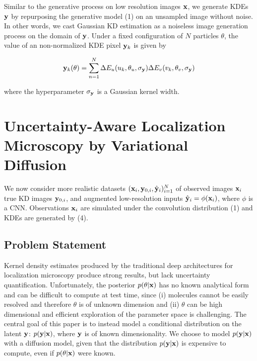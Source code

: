 \documentclass{article}
\begin{document}
Similar to the generative process on low resolution images $\bold{x}$, we generate KDEs $\bold{y}$ by repurposing the generative model (1) on an unsampled image without noise. In other words, we cast Gaussian KD estimation as a noiseless image generation process on the domain of $\bold{y}$. Under a fixed configuration of $N$ particles $\theta$, the value of an non-normalized KDE pixel $\bold{y}_{k}$ is given by

\begin{equation}
\bold{y}_{k}(\theta) = \sum_{n=1}^{N}\Delta E_{u}(u_{k},\theta_{u},\sigma_{\bold{y}}) \Delta E_{v}(v_{k},\theta_{v},\sigma_{\bold{y}})
\end{equation}

where the hyperparameter $\sigma_{\bold{y}}$ is a Gaussian kernel width. 

\section{Uncertainty-Aware Localization Microscopy by Variational Diffusion}

We now consider more realistic datasets $(\bold{x}_i,\bold{y}_{0,i},\hat{\bold{y}}_{i})_{i=1}^{N}$ of observed images $\bold{x}_i$ true KD images $\bold{y}_{0,i}$, and augmented low-resolution inputs $\hat{\bold{y}}_{i}=\phi(\bold{x}_{i})$, where $\phi$ is a CNN. Observations $\bold{x}_i$ are simulated under the convolution distribution (1) and KDEs are generated by (4).

\subsection{Problem Statement}

Kernel density estimates produced by the traditional deep architectures for localization microscopy produce strong results, but lack uncertainty quantification. Unfortunately, the posterior $p(\theta|\bold{x})$ has no known analytical form and can be difficult to compute at test time, since (i) molecules cannot be easily resolved and therefore $\theta$ is of unknown dimension and (ii) $\theta$ can be high dimensional and efficient exploration of the parameter space is challenging. The central goal of this paper is to instead model a conditional distribution on the latent $\bold{y}$: $p(\bold{y}|\bold{x})$, where $\bold{y}$ is of known dimensionality. We choose to model $p(\bold{y}|\bold{x})$ with a diffusion model, given that the distribution $p(\bold{y}|\bold{x})$ is expensive to compute, even if $p(\theta|\bold{x})$ were known.
\end{document}
